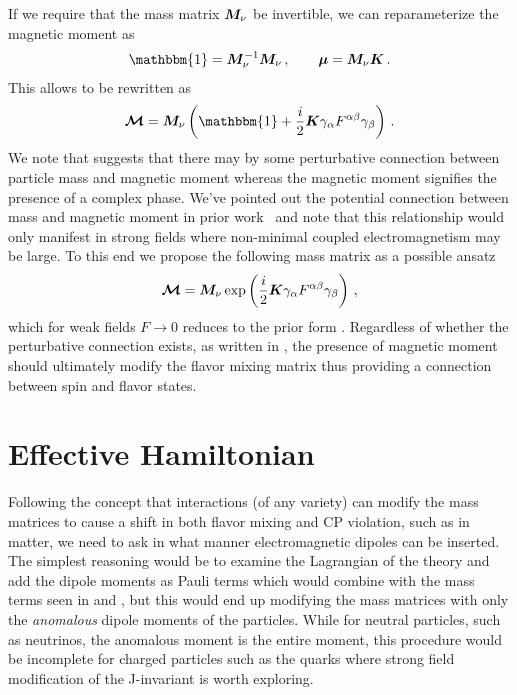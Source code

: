 If we require that the mass matrix $\boldsymbol{M}_{\nu}$ be invertible, we can reparameterize the magnetic moment as 
\begin{align}
	\label{invert:1}
    \mathbbm{1} = \bb{M}_{\nu}^{-1}\bb{M}_{\nu}\,,\qquad
    \bb{\mu} = \bb{M}_{\nu}\bb{K}\,.
\end{align}
This allows  to be rewritten as
\begin{alignat}{1}
	\label{invert:2} {\bb{\mathcal{M}}} = \bb{M}_{\nu}\left(\mathbbm{1} + \frac{i}{2}\bb{K}\gamma_{\alpha}F^{\alpha\beta}\gamma_{\beta}\right)\,.
\end{alignat}
We note that  suggests that there may by some perturbative connection between particle mass and magnetic moment whereas the magnetic moment signifies the presence of a complex phase. We've pointed out the potential connection between mass and magnetic moment in prior work~\citep{steinmetz2018magnetic} and note that this relationship would only manifest in strong fields where non-minimal coupled electromagnetism may be large. To this end we propose the following mass matrix as a possible ansatz
\begin{alignat}{1}
	\label{mass:eq:10} {\boldsymbol{\mathcal{M}}} = \boldsymbol{M}_{\nu}\,\mathrm{exp}\left(\frac{i}{2}\boldsymbol{K}\gamma_{\alpha}F^{\alpha\beta}\gamma_{\beta}\right)\,,
\end{alignat}
which for weak fields $F\rightarrow0$ reduces to the prior form . Regardless of whether the perturbative connection exists, as written in , the presence of magnetic moment should ultimately modify the flavor mixing matrix thus providing a connection between spin and flavor states.

\section{Effective Hamiltonian}\label{sec:effective}
\noindent Following the concept that interactions (of any variety) can modify the mass matrices to cause a shift in both flavor mixing and CP violation, such as in matter, we need to ask in what manner electromagnetic dipoles can be inserted. The simplest reasoning would be to examine the Lagrangian of the theory and add the dipole moments as Pauli terms \ar which would combine with the mass terms seen in  and , but this would end up modifying the mass matrices with only the \emph{anomalous} dipole moments of the particles. While for neutral particles, such as neutrinos, the anomalous moment is the entire moment, this procedure would be incomplete for charged particles such as the quarks where strong field modification of the J-invariant is worth exploring.

